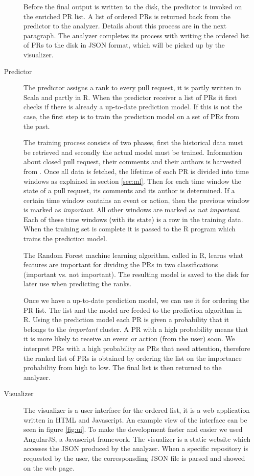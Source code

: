 \begin{description}
Before the final output is written to the disk, the predictor is invoked on the enriched PR list.
A list of ordered PRs is returned back from the predictor to the analyzer.
Details about this process are in the next paragraph.
The analyzer completes its process with writing the ordered list of PRs to the disk in JSON format, which will be picked up by the visualizer.

\item[Predictor]
The predictor assigns a rank to every pull request, it is partly written in Scala and partly in R.
When the predictor receiver a list of PRs it first checks if there is already a up-to-date prediction model.
If this is not the case, the first step is to train the prediction model on a set of PRs from the past.

The training process consists of two phases, first the historical data must be retrieved and secondly the actual model must be trained.
Information about closed pull request, their comments and their authors is harvested from \ghtorrent.
Once all data is fetched, the lifetime of each PR is divided into time windows as explained in section \ref{sec:ml}.
Then for each time window the state of a pull request, its comments and its author is determined.
If a certain time window contains an event or action, then the previous window is marked as \emph{important}.
All other windows are marked as \emph{not important}.
Each of these time windows (with its state) is a row in the training data.
When the training set is complete it is passed to the R program which trains the prediction model.

The Random Forest machine learning algorithm, called in R, learns what features are important for dividing the PRs in two classifications (important vs. not important).
The resulting model is saved to the disk for later use when predicting the ranks.

Once we have a up-to-date prediction model, we can use it for ordering the PR list.
The list and the model are feeded to the prediction algorithm in R.
Using the prediction model each PR is given a probability that it belongs to the \emph{important} cluster.
A PR with a high probability means that it is more likely to receive an event or action (from the user) soon.
We interpret PRs with a high probability as PRs that need attention, therefore the ranked list of PRs is obtained by ordering the list on the importance probability from high to low.
The final list is then returned to the analyzer.

\item[Visualizer]
The visualizer is a user interface for the ordered list, it is a web application written in HTML and Javascript.
An example view of the interface can be seen in figure \ref{fig:ui}.
To make the development faster and easier we used AngularJS, a Javascript framework.
The visualizer is a static website which accesses the JSON produced by the analyzer.
When a specific repository is requested by the user, the corresponsding JSON file is parsed and showed on the web page.


\end{description}
